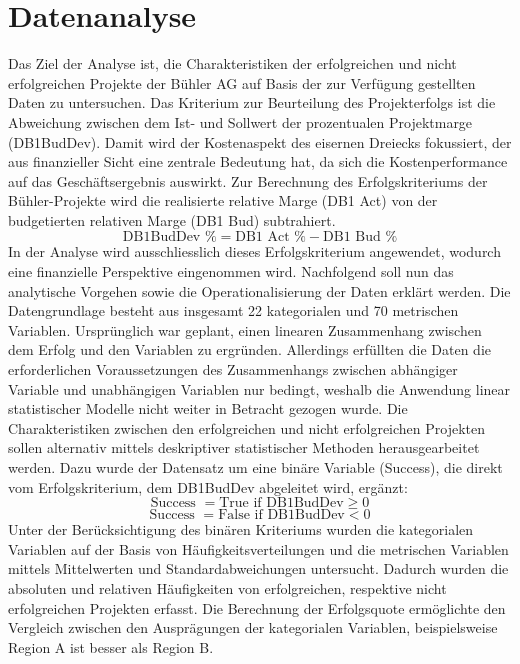 \section{Datenanalyse}\label{sec:dataana}
Das Ziel der Analyse ist, die Charakteristiken der erfolgreichen und nicht erfolgreichen Projekte der Bühler AG auf Basis der zur Verfügung gestellten Daten zu untersuchen. Das Kriterium zur Beurteilung des Projekterfolgs ist die Abweichung zwischen dem Ist- und Sollwert der prozentualen Projektmarge (DB1BudDev). Damit wird der Kostenaspekt des eisernen Dreiecks fokussiert, der aus finanzieller Sicht eine zentrale Bedeutung hat, da sich die Kostenperformance auf das Geschäftsergebnis auswirkt. Zur Berechnung des Erfolgskriteriums der Bühler-Projekte wird die realisierte relative Marge (DB1 Act) von der budgetierten relativen Marge (DB1 Bud) subtrahiert. 
\begin{equation*}
\text{DB1BudDev \%} = \text{DB1 Act \%} - \text{DB1 Bud \%}
\end{equation*}
In der Analyse wird ausschliesslich dieses Erfolgskriterium angewendet, wodurch eine finanzielle Perspektive eingenommen wird. Nachfolgend soll nun das analytische Vorgehen sowie die Operationalisierung der Daten erklärt werden. 
\newline\newline
Die Datengrundlage besteht aus insgesamt 22 kategorialen und 70 metrischen Variablen. Ursprünglich war geplant, einen linearen Zusammenhang zwischen dem Erfolg und den Variablen zu ergründen. Allerdings erfüllten die Daten die erforderlichen Voraussetzungen des Zusammenhangs zwischen abhängiger Variable und unabhängigen Variablen nur bedingt, weshalb die Anwendung linear statistischer Modelle nicht weiter in Betracht gezogen wurde. Die Charakteristiken zwischen den erfolgreichen und nicht erfolgreichen Projekten sollen alternativ mittels deskriptiver statistischer Methoden  herausgearbeitet werden. Dazu wurde der Datensatz um eine binäre Variable (Success), die direkt vom Erfolgskriterium, dem DB1BudDev abgeleitet wird, ergänzt:
\begin{equation*}
\text{Success } = \text{True if } \text{DB1BudDev}\geq 0
\end{equation*}
\begin{equation*}
\text{Success } = \text{False if } \text{DB1BudDev} < 0
\end{equation*}
Unter der Berücksichtigung des binären Kriteriums wurden die kategorialen Variablen auf der Basis von Häufigkeitsverteilungen und die metrischen Variablen mittels Mittelwerten und Standardabweichungen untersucht. Dadurch wurden die absoluten und relativen Häufigkeiten von erfolgreichen, respektive nicht erfolgreichen Projekten erfasst. Die Berechnung der Erfolgsquote ermöglichte den Vergleich zwischen den Ausprägungen der kategorialen Variablen, beispielsweise Region A ist besser als Region B.
